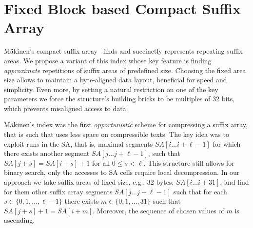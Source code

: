 \documentclass{cai}
\begin{document}
\section{Fixed Block based Compact Suffix Array} \label{sec:fbsa}

M{\"a}kinen's compact suffix
array~\cite{DBLP:conf/cpm/Makinen00,DBLP:journals/fuin/Makinen03} 
finds and succinctly represents repeating suffix areas.
We propose a variant of this index
whose key feature is 
finding {\em approximate} repetitions of suffix areas of predefined size.
Choosing the fixed area size 
allows to maintain a byte-aligned data layout, 
beneficial for speed and simplicity.
Even more, by setting a natural restriction on one of the key parameters 
we force the structure's building bricks to be multiples of 32 bits, 
which prevents misaligned access to data.

M{\"a}kinen's index was the first {\em opportunistic} scheme for 
compressing a suffix array, that is such that uses less space on compressible 
texts.
The key idea was to exploit runs in the SA, that is, maximal 
segments $SA[i \ldots i + \ell - 1]$ for which there exists another 
segment $SA[j \ldots j + \ell - 1]$, such that $SA[j + s] = SA[i + s] + 1$ 
for all $0 \leq s < \ell$.
This structure still allows for binary search, only the accesses to SA cells 
require local decompression.
In our approach we take suffix areas of fixed size, e.g., 32 bytes: 
$SA[i \ldots i+31]$, and find for them other suffix array segments 
$SA[j \ldots j + \ell - 1]$ such that for each $s \in \{0, 1, \ldots, \ell - 1\}$ there exists $m \in \{0, 1, \ldots, 31\}$ such that $SA[j + s] + 1 = SA[i + m]$. 
Moreover, the sequence of chosen values of $m$ is ascending. 
\end{document}
